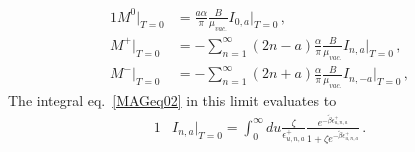 \documentclass[
aps,
pra,
twocolumn,
showpacs,
preprintnumbers,
amsmath,
amssymb,
footinbib
]{revtex4-2}
\begin{document}
\begin{alignat}{1}
  \label{ZEROeq01} M^{0}|_{T=0}&=\frac{a\alpha}{\pi}\frac{B}{\mu_{vac.}}I_{0,a}|_{T=0}\,,\\
  \label{ZEROeq02} M^{+}|_{T=0}&=-\sum_{n=1}^{\infty}(2n-a)\frac{\alpha}{\pi}\frac{B}{\mu_{vac.}}I_{n,a}|_{T=0}\,,\\
  \label{ZEROeq03} M^{-}|_{T=0}&=-\sum_{n=1}^{\infty}(2n+a)\frac{\alpha}{\pi}\frac{B}{\mu_{vac.}}I_{n,-a}|_{T=0}\,,
\end{alignat}
The integral eq.~\eqref{MAGeq02} in this limit evaluates to
\begin{alignat}{1}
  \label{ZEROeq04} &I_{n,a}|_{T=0}=\int_{0}^{\infty}du\frac{\zeta}{\epsilon_{u,n,a}^{+}}\frac{e^{-\tilde{\beta}\epsilon_{u,n,a}^{+}}}{1+\zeta e^{-\tilde{\beta}\epsilon_{u,n,a}^{+}}}\,.
\end{alignat}

\end{document}
